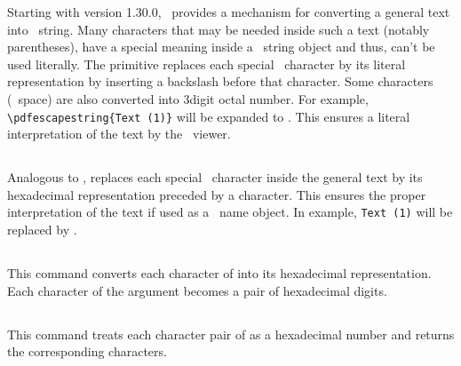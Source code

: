 \documentclass{pdftexmanual}
\begin{document}
Starting with version 1.30.0, \PDFTEX\ provides a mechanism for
converting a general text into \PDF\ string. Many characters that may be
needed inside such a text (notably parentheses), have a special meaning
inside a \PDF\ string object and thus, can't be used literally. The
primitive replaces each special \PDF\ character by its literal
representation by inserting a backslash before that character. Some
characters (\eg\ space) are also converted into 3\hyph digit octal
number. For example, \verb|\pdfescapestring{Text (1)}| will be expanded
to . This ensures a literal interpretation of the
text by the \PDF\ viewer. 

\subsection{}

Analogous to ,  replaces each
special \PDF\ character inside the general text by its hexadecimal
representation preceded by a \type{#} character. This ensures the proper
interpretation of the text if used as a \PDF\ name object. In example,
\verb|Text (1)| will be replaced by .

\subsection{}

This command converts each character of  into its
hexadecimal representation. Each character of the argument becomes a pair of
hexadecimal digits. 

\subsection{}

This command treats each character pair of  as
a hexadecimal number and returns the corresponding characters.

\subsection{}
\end{document}
